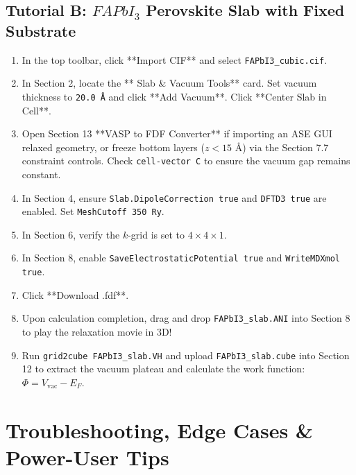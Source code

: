 \documentclass[11pt,a4paper]{article}
\begin{document}
\subsection{Tutorial B: $FAPbI_3$ Perovskite Slab with Fixed Substrate}
\begin{enumerate}[leftmargin=*]
 \item In the top toolbar, click **Import CIF** and select \texttt{FAPbI3\_cubic.cif}.
 \item In Section 2, locate the ** Slab \& Vacuum Tools** card. Set vacuum thickness to \texttt{20.0 \AA} and click **Add Vacuum**. Click **Center Slab in Cell**.
 \item Open Section 13 **VASP to FDF Converter** if importing an ASE GUI relaxed geometry, or freeze bottom layers ($z < 15\text{ \AA}$) via the Section 7.7 constraint controls. Check \texttt{cell-vector C} to ensure the vacuum gap remains constant.
 \item In Section 4, ensure \texttt{Slab.DipoleCorrection true} and \texttt{DFTD3 true} are enabled. Set \texttt{MeshCutoff 350 Ry}.
 \item In Section 6, verify the $k$-grid is set to $4 \times 4 \times 1$.
 \item In Section 8, enable \texttt{SaveElectrostaticPotential true} and \texttt{WriteMDXmol true}.
 \item Click **Download .fdf**.
 \item Upon calculation completion, drag and drop \texttt{FAPbI3\_slab.ANI} into Section 8 to play the relaxation movie in 3D!
 \item Run \texttt{grid2cube FAPbI3\_slab.VH} and upload \texttt{FAPbI3\_slab.cube} into Section 12 to extract the vacuum plateau and calculate the work function: $\Phi = V_{\text{vac}} - E_F$.
\end{enumerate}

\newpage
\section{Troubleshooting, Edge Cases \& Power-User Tips}
\end{document}
